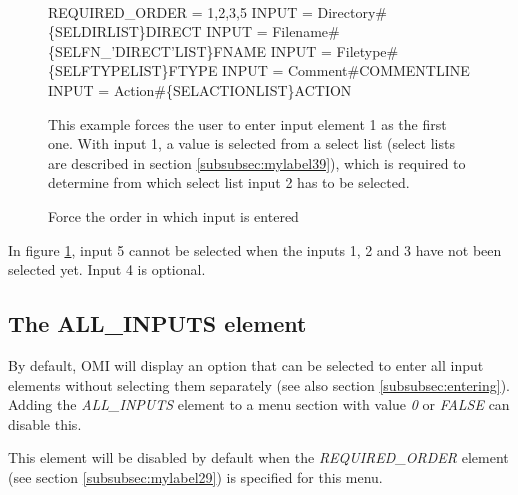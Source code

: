 \documentclass[a4paper]{book}
\newcommand{\vs}{\vspace{3mm}}
\renewcommand{\indent}{\hspace*{5mm}}
\begin{document}
\begin{figure}[h!tb]
\begin{minipage}[h!tb]{\textwidth}
\hrulefill \\
\begin{ttfamily}
 \newline
\indent REQUIRED{\_}ORDER = 1,2,3,5 \newline
\indent INPUT = Directory{\#}{\{}SEL\textbar DIRLIST{\}}DIRECT \newline
\indent INPUT = Filename{\#}{\{}SEL\textbar FN{\_}'DIRECT'LIST{\}}FNAME \newline
\indent INPUT = Filetype{\#}{\{}SEL\textbar FTYPELIST{\}}FTYPE \newline
\indent INPUT = Comment{\#}COMMENTLINE \newline
\indent INPUT = Action{\#}{\{}SEL\textbar ACTIONLIST{\}}ACTION \newline
\end{ttfamily}
\noindent This example forces the user to enter input element 1 as the first one. With 
input 1, a value is selected from a select list (select lists are described 
in section \ref{subsubsec:mylabel39}), which is required to determine 
from which select list input 2 has to be selected.
\caption{Force the order in which input is entered}\label{fig:reqorder}
\hrulefill
\end{minipage}
\end{figure}

In figure \ref{fig:reqorder}, input 5 cannot be selected when the inputs 1, 2 and 3 have 
not been selected yet. Input 4 is optional.

\subsection{The ALL{\_}INPUTS element}
\label{subsubsec:mylabel30}

By default, OMI will display an option that can be selected to enter all 
input elements without selecting them separately (see also section 
\ref{subsubsec:entering}). Adding the \textsl{ALL{\_}INPUTS} element to a menu 
section with value \textsl{0} or \textsl{FALSE} can disable this.

\vs

This element will be disabled by default when the \textsl{REQUIRED{\_}ORDER} element 
(see section \ref{subsubsec:mylabel29}) is specified for this menu.
\end{document}

